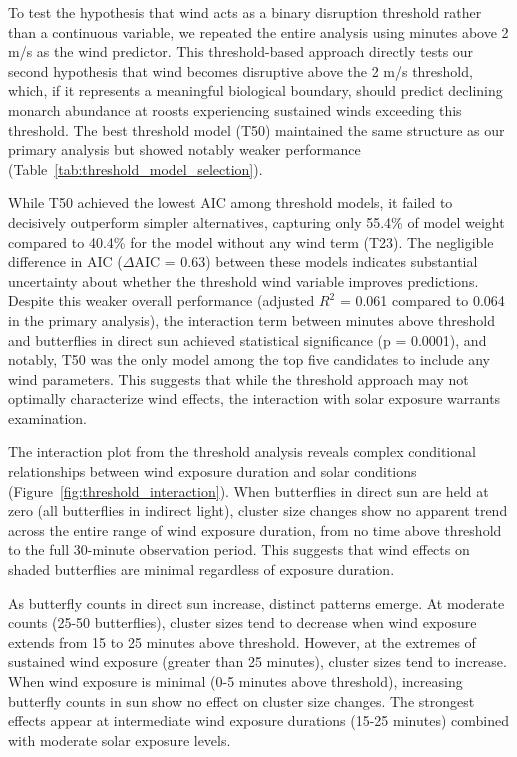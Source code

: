 To test the hypothesis that wind acts as a binary disruption threshold rather than a continuous variable, we repeated the entire analysis using minutes above 2 m/s as the wind predictor. This threshold-based approach directly tests our second hypothesis that wind becomes disruptive above the 2 m/s threshold, which, if it represents a meaningful biological boundary, should predict declining monarch abundance at roosts experiencing sustained winds exceeding this threshold. The best threshold model (T50) maintained the same structure as our primary analysis but showed notably weaker performance (Table~\ref{tab:threshold_model_selection}).

While T50 achieved the lowest AIC among threshold models, it failed to decisively outperform simpler alternatives, capturing only 55.4\% of model weight compared to 40.4\% for the model without any wind term (T23). The negligible difference in AIC ($\Delta$AIC = 0.63) between these models indicates substantial uncertainty about whether the threshold wind variable improves predictions. Despite this weaker overall performance (adjusted $R^2$ = 0.061 compared to 0.064 in the primary analysis), the interaction term between minutes above threshold and butterflies in direct sun achieved statistical significance (p = 0.0001), and notably, T50 was the only model among the top five candidates to include any wind parameters. This suggests that while the threshold approach may not optimally characterize wind effects, the interaction with solar exposure warrants examination.



The interaction plot from the threshold analysis reveals complex conditional relationships between wind exposure duration and solar conditions (Figure~\ref{fig:threshold_interaction}). When butterflies in direct sun are held at zero (all butterflies in indirect light), cluster size changes show no apparent trend across the entire range of wind exposure duration, from no time above threshold to the full 30-minute observation period. This suggests that wind effects on shaded butterflies are minimal regardless of exposure duration.

As butterfly counts in direct sun increase, distinct patterns emerge. At moderate counts (25-50 butterflies), cluster sizes tend to decrease when wind exposure extends from 15 to 25 minutes above threshold. However, at the extremes of sustained wind exposure (greater than 25 minutes), cluster sizes tend to increase. When wind exposure is minimal (0-5 minutes above threshold), increasing butterfly counts in sun show no effect on cluster size changes. The strongest effects appear at intermediate wind exposure durations (15-25 minutes) combined with moderate solar exposure levels.

